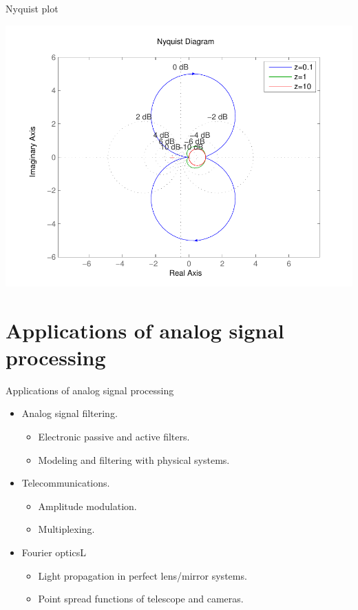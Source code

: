   \begin{block}{Nyquist plot}
    \begin{center}
      \includegraphics[width=.8\linewidth]{imgs/fourier/nyquist_2o}
    \end{center}
  \end{block}

\section{Applications of analog signal processing}
\label{sec:appli-ft}

\begin{block}{Applications of analog signal processing} \vspace{-1mm}
    \begin{itemize}
        \item Analog signal filtering. 
        \begin{itemize}
            \item Electronic passive and active filters.
            \item Modeling and filtering with physical systems.
        \end{itemize}
        \item Telecommunications. \vspace{-1mm}
            \begin{itemize}
                \item Amplitude modulation.
                \item Multiplexing.
            \end{itemize}
        \item Fourier opticsL\vspace{-1mm}
        \begin{itemize}
            \item Light propagation in perfect lens/mirror systems.
            \item Point spread functions of telescope and cameras.
        \end{itemize}
    \end{itemize}
\end{block}

